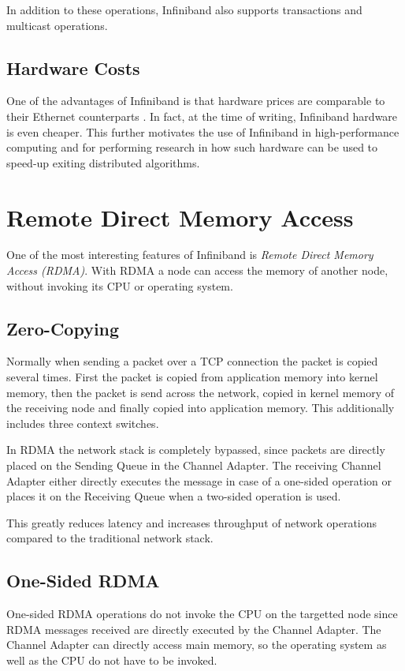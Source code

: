In addition to these operations, Infiniband also supports transactions and multicast operations. 

\subsection{Hardware Costs}
One of the advantages of Infiniband is that hardware prices are comparable to their Ethernet counterparts \cite{pilaf}. In fact, at the time of writing, Infiniband hardware is even cheaper. This further motivates the use of Infiniband in high-performance computing and for performing research in how such hardware can be used to speed-up exiting distributed algorithms. 

\section{Remote Direct Memory Access}
One of the most interesting features of Infiniband is \emph{Remote Direct Memory Access (RDMA)}. With RDMA a node can access the memory of another node, without invoking its CPU or operating system.

\subsection{Zero-Copying}
Normally when sending a packet over a TCP connection the packet is copied several times. First the packet is copied from application memory into kernel memory, then the packet is send across the network, copied in kernel memory of the receiving node and finally copied into application memory. This additionally includes three context switches.

In RDMA the network stack is completely bypassed, since packets are directly placed on the Sending Queue in the Channel Adapter. The receiving Channel Adapter either directly executes the message in case of a one-sided operation or places it on the Receiving Queue when a two-sided operation is used. 

This greatly reduces latency and increases throughput of network operations compared to the traditional network stack. 

\subsection{One-Sided RDMA}
One-sided RDMA operations do not invoke the CPU on the targetted node since RDMA messages received are directly executed by the Channel Adapter. The Channel Adapter can directly access main memory, so the operating system as well as the CPU do not have to be invoked. 

